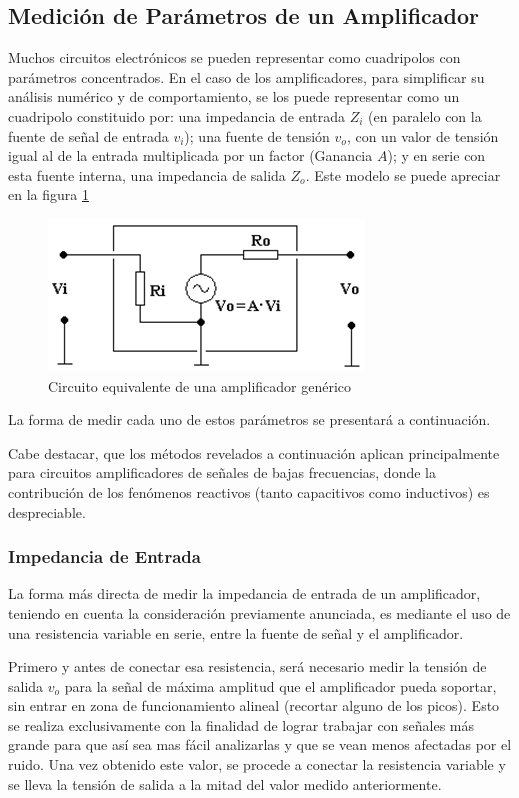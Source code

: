 
\subsection{Medición de Parámetros de un Amplificador}

Muchos circuitos electrónicos se pueden representar como cuadripolos con parámetros concentrados. En el caso de los amplificadores, para simplificar su análisis numérico y de comportamiento, se los puede representar como un cuadripolo constituido por: una impedancia de entrada $Z_i$ (en paralelo con la fuente de señal de entrada $v_i$); una fuente de tensión $v_o$, con un valor de tensión igual al de la entrada multiplicada por un factor (Ganancia $A$); y en serie con esta fuente interna, una impedancia de salida $Z_o$. Este modelo se puede apreciar en la figura \ref{fig:cuadAmp}

\begin{figure}[h]
    \centering
    \includegraphics[width=0.45\linewidth]{Imagenes/cuadAmp.png}
    \caption{Circuito equivalente de una amplificador genérico}
    \label{fig:cuadAmp}
\end{figure}

La forma de medir cada uno de estos parámetros se presentará a continuación.

Cabe destacar, que los métodos revelados a continuación aplican principalmente para circuitos amplificadores de señales de bajas frecuencias, donde la contribución de los fenómenos reactivos (tanto capacitivos como inductivos) es despreciable.

\subsubsection{Impedancia de Entrada}
\label{sec:Zi}

La forma más directa de medir la impedancia de entrada de un amplificador, teniendo en cuenta la consideración previamente anunciada, es mediante el uso de una resistencia variable en serie, entre la fuente de señal y el amplificador.

Primero y antes de conectar esa resistencia, será necesario medir la tensión de salida $v_o$ para la señal de máxima amplitud que el amplificador pueda soportar, sin entrar en zona de funcionamiento alineal (recortar alguno de los picos). Esto se realiza exclusivamente con la finalidad de lograr trabajar con señales más grande para que así sea mas fácil analizarlas y que se vean menos afectadas por el ruido. Una vez obtenido este valor, se procede a conectar la resistencia variable y se lleva la tensión de salida a la mitad del valor medido anteriormente. 

